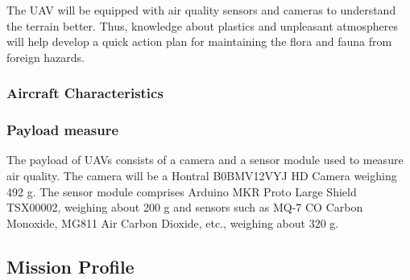 \documentclass[12 pt]{article}
\begin{document}
The UAV will be equipped with air quality sensors and cameras to understand the terrain better. Thus, knowledge about plastics and unpleasant atmospheres will help develop a quick action plan for maintaining the flora and fauna from foreign hazards.

\subsubsection{Aircraft Characteristics}
\begin{table}[h]
\centering
{}
\caption{Initial Mission Requirements}
\label{Mission Requirements}
\end{table}

\subsubsection{Payload measure}
The payload of UAVs consists of a camera and a sensor module used to measure air quality. The camera will be a Hontral B0BMV12VYJ HD Camera weighing 492 g. The sensor module comprises Arduino MKR Proto Large Shield TSX00002, weighing about 200 g and sensors such as MQ-7 CO Carbon Monoxide, MG811 Air Carbon Dioxide, etc., weighing about 320 g.

\subsection{Mission Profile}
\end{document}
